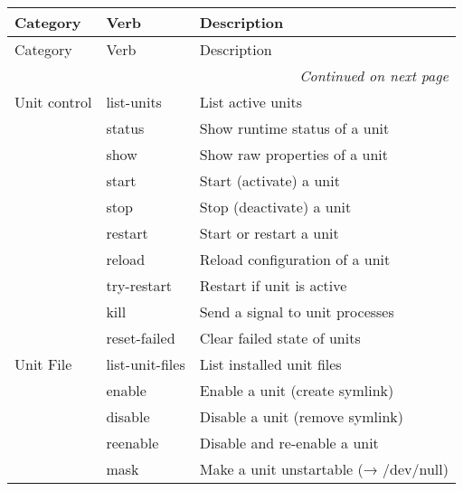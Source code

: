 \documentclass[openany, 12pt]{book}
\begin{document}
\begin{longtable}{lll}
  \toprule
  Category      & Verb                   & Description                             \\
  \midrule
  \endfirsthead

  \toprule
  Category      & Verb                   & Description                             \\
  \midrule
  \endhead

  \midrule
  \multicolumn{3}{r}{\small\emph{Continued on next page}}                          \\
  \midrule
  \endfoot

  \bottomrule
  \endlastfoot

  Unit control  & list-units             & List active units                       \\
                & status                 & Show runtime status of a unit           \\
                & show                   & Show raw properties of a unit           \\
                & start                  & Start (activate) a unit                 \\
                & stop                   & Stop (deactivate) a unit                \\
                & restart                & Start or restart a unit                 \\
                & reload                 & Reload configuration of a unit          \\
                & try-restart            & Restart if unit is active               \\
                & kill                   & Send a signal to unit processes         \\
                & reset-failed           & Clear failed state of units             \\
  \midrule
  Unit File     & list-unit-files        & List installed unit files               \\
                & enable                 & Enable a unit (create symlink)          \\
                & disable                & Disable a unit (remove symlink)         \\
                & reenable               & Disable and re-enable a unit            \\
                & mask                   & Make a unit unstartable (→ /dev/null)   \\

\end{longtable}
\end{document}
